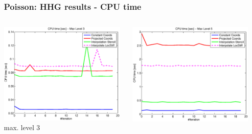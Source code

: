 \documentclass[t,compress=false,usepdftitle=false]{beamer}
\begin{document}
\begin{frame}\frametitle{Poisson: HHG results - CPU time}

\begin{columns}[T] 
\begin{column}[T]{4.3cm} 
  \centering
  \includegraphics[width=0.98\textwidth]{spherepoisson_cpuTime_level3}\\
  max. level 3
\end{column}\hfill
\begin{column}[T]{4.3cm} 
  \centering
  \includegraphics[width=0.98\textwidth]{spherepoisson_cpuTime_level5}\\

\end{column}
\end{columns}
\end{frame}
\end{document}
